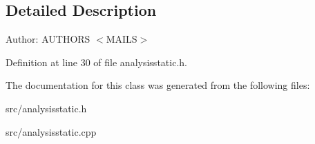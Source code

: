 \subsection{Detailed Description}
\begin{Desc}
\item[Author:]AUTHORS $<$MAILS$>$ \end{Desc}


Definition at line 30 of file analysisstatic.h.

The documentation for this class was generated from the following files:\begin{CompactItemize}
\item 
src/analysisstatic.h\item 
src/analysisstatic.cpp\end{CompactItemize}
